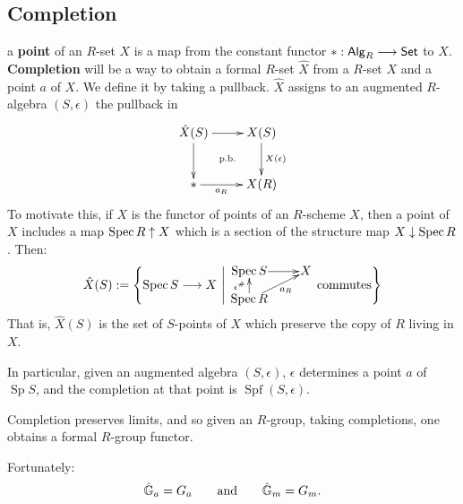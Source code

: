\documentclass[11pt]{article}
\newcommand{\RAlg}{\mathsf{Alg}_R}
\DeclareMathOperator{\SPec}{Sp}
\DeclareMathOperator{\SPf}{Spf}
\begin{document}
\subsection{Completion}
\begin{itemise}
\setlength{\parindent}{.25in}
\item {} a \textbf{point} of an $R$-set $X$ is a map from the constant functor $\ast:\RAlg\to\Set$ to $X$. \textbf{Completion} will be a way to obtain a formal $R$-set $\hat{X}$ from a $R$-set $X$ and a point $a$ of $X$. We define it by taking a pullback. $\hat X$ assigns to an augmented $R$-algebra $(S,\epsilon)$ the pullback in
\[\xymatrix{
\hat X(S) %
\ar[r]   %
\ar[d]   %
\ar@{}[rd]|{\textup{p.b.}}&
X(S) %
\ar[d]^-{X(\epsilon)}\\ %
\ast %
\ar[r]_-{a_R}&  %
X(R)  %
}\]
To motivate this, if $X$ is the functor of points of an $R$-scheme $X$, then a point of $X$ includes a map $\operatorname{Spec} R\uparrow X$ which is a section of the structure map $X\downarrow\operatorname{Spec} R$. Then:%
\[\hat X(S):=\left\{\spec S\to X\ \middle|\ 
\vcenter{\xymatrix@R=4mm@1{
\spec S
\ar[r]
&%
X\\%
\spec R
\ar[u]^-{\epsilon^\#}
\ar[ur]_-{a_R}
&%
}}\textup{\ commutes}\right\}\]
That is, $\hat X(S)$ is the set of $S$-points of $X$ which preserve the copy of $R$ living in $X$.
\item In particular, given an augmented algebra $(S,\epsilon)$, $\epsilon$ determines a point $a$ of $\SPec S$, and the completion at that point is $\SPf(S,\epsilon)$.
\item Completion preserves limits, and so given an $R$-group, taking completions, one obtains a formal $R$-group functor.
\item Fortunately:
\[\hat{\mathbb{G}}_a=G_a\qquad \textup{and}\qquad \hat{\mathbb{G}}_m=G_m.\]
\end{itemise}
\end{document}
